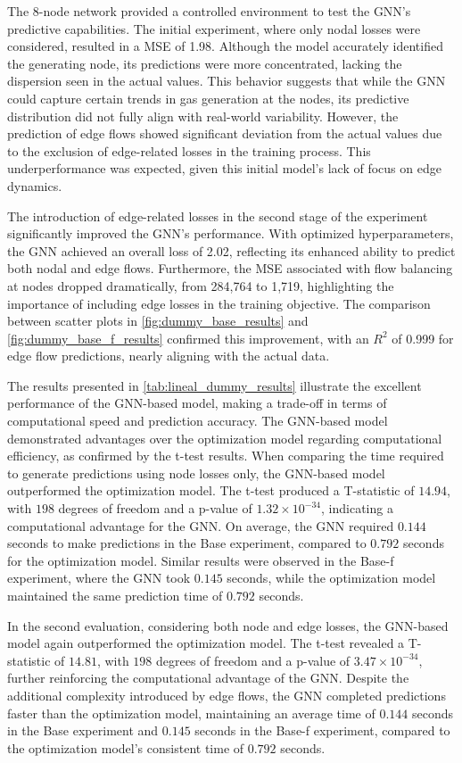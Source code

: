 The 8-node network provided a controlled environment to test the GNN's predictive capabilities. The initial experiment, where only nodal losses were considered, resulted in a MSE of 1.98. Although the model accurately identified the generating node, its predictions were more concentrated, lacking the dispersion seen in the actual values. This behavior suggests that while the GNN could capture certain trends in gas generation at the nodes, its predictive distribution did not fully align with real-world variability. However, the prediction of edge flows showed significant deviation from the actual values due to the exclusion of edge-related losses in the training process. This underperformance was expected, given this initial model's lack of focus on edge dynamics.

The introduction of edge-related losses in the second stage of the experiment significantly improved the GNN's performance. With optimized hyperparameters, the GNN achieved an overall loss of 2.02, reflecting its enhanced ability to predict both nodal and edge flows. Furthermore, the MSE associated with flow balancing at nodes dropped dramatically, from 284,764 to 1,719, highlighting the importance of including edge losses in the training objective. The comparison between scatter plots in \cref{fig:dummy_base_results} and \cref{fig:dummy_base_f_results} confirmed this improvement, with an $R^2$ of 0.999 for edge flow predictions, nearly aligning with the actual data.

 The results presented in \cref{tab:lineal_dummy_results} illustrate the excellent performance of the GNN-based model, making a trade-off in terms of computational speed and prediction accuracy. The GNN-based model demonstrated advantages over the optimization model regarding computational efficiency, as confirmed by the t-test results. When comparing the time required to generate predictions using node losses only, the GNN-based model outperformed the optimization model. The t-test produced a T-statistic of $14.94$, with $198$ degrees of freedom and a p-value of $1.32 \times 10^{-34}$, indicating a computational advantage for the GNN. On average, the GNN required $0.144$ seconds to make predictions in the Base experiment, compared to $0.792$ seconds for the optimization model. Similar results were observed in the Base-f experiment, where the GNN took $0.145$ seconds, while the optimization model maintained the same prediction time of $0.792$ seconds.

In the second evaluation, considering both node and edge losses, the GNN-based model again outperformed the optimization model. The t-test revealed a T-statistic of $14.81$, with $198$ degrees of freedom and a p-value of $3.47 \times 10^{-34}$, further reinforcing the computational advantage of the GNN. Despite the additional complexity introduced by edge flows, the GNN completed predictions faster than the optimization model, maintaining an average time of $0.144$ seconds in the Base experiment and $0.145$ seconds in the Base-f experiment, compared to the optimization model's consistent time of $0.792$ seconds.

